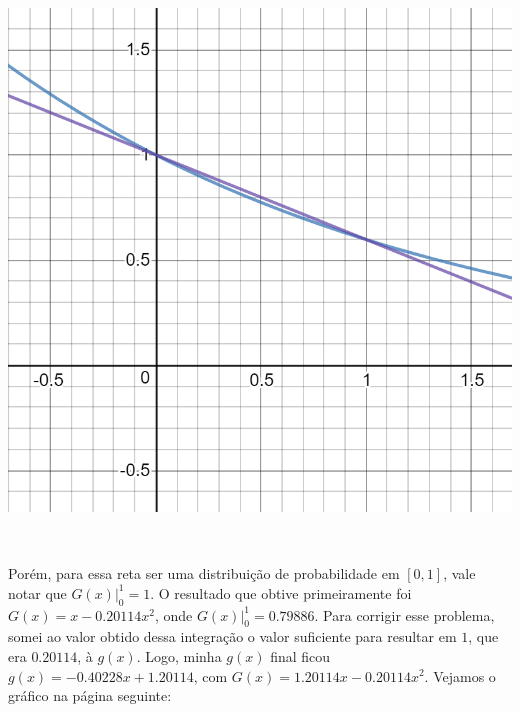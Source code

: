\documentclass[pt12]{article}
\begin{document}
\begin{center}\includegraphics[scale=0.3]{desmos-graph.png}\end{center}
\ 

Porém, para essa reta ser uma distribuição de probabilidade em $[0,1]$, vale notar que $\displaystyle{G(x)\vert_{0}^{1} = 1}$. O resultado que obtive primeiramente foi $G(x) = x - 0.20114x^2$, onde $G(x)\vert_{0}^{1} = 0.79886$.
Para corrigir esse problema, somei ao valor obtido dessa integração o valor suficiente para resultar em $1$, que era $0.20114$, à $g(x)$. Logo, minha $g(x)$ final ficou $g(x) = -0.40228x+1.20114$, com $G(x) = 1.20114x - 0.20114x^2$. Vejamos o gráfico na página seguinte:\\
\ 
\end{document}

